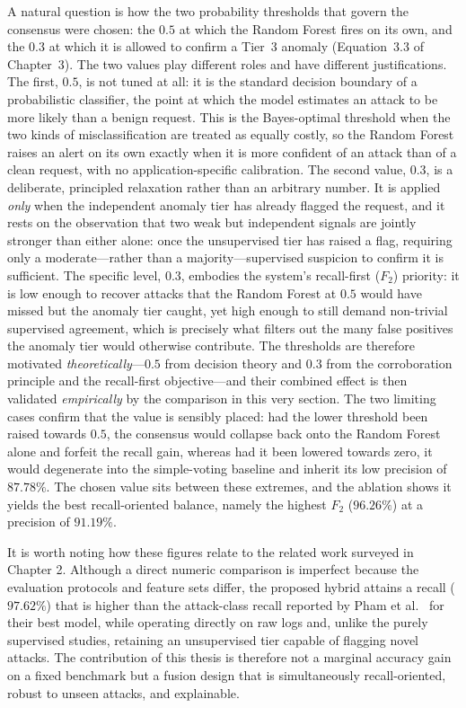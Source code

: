 \documentclass[../main.tex]{subfiles}
\begin{document}
A natural question is how the two probability thresholds that govern the
consensus were chosen: the $0.5$ at which the Random Forest fires on its own,
and the $0.3$ at which it is allowed to confirm a Tier~3 anomaly
(Equation~3.3 of Chapter~3). The two values play different roles and have
different justifications. The first, $0.5$, is not tuned at all: it is the
standard decision boundary of a probabilistic classifier, the point at which
the model estimates an attack to be more likely than a benign request. This is
the Bayes-optimal threshold when the two kinds of misclassification are treated
as equally costly, so the Random Forest raises an alert on its own exactly when
it is more confident of an attack than of a clean request, with no
application-specific calibration. The second value, $0.3$, is a deliberate,
principled relaxation rather than an arbitrary number. It is applied
\emph{only} when the independent anomaly tier has already flagged the request,
and it rests on the observation that two weak but independent signals are
jointly stronger than either alone: once the unsupervised tier has raised a
flag, requiring only a moderate---rather than a majority---supervised suspicion
to confirm it is sufficient. The specific level, $0.3$, embodies the system's
recall-first ($F_2$) priority: it is low enough to recover attacks that the
Random Forest at $0.5$ would have missed but the anomaly tier caught, yet high
enough to still demand non-trivial supervised agreement, which is precisely
what filters out the many false positives the anomaly tier would otherwise
contribute. The thresholds are therefore motivated \emph{theoretically}---$0.5$
from decision theory and $0.3$ from the corroboration principle and the
recall-first objective---and their combined effect is then validated
\emph{empirically} by the comparison in this very section. The two limiting
cases confirm that the value is sensibly placed: had the lower threshold been
raised towards $0.5$, the consensus would collapse back onto the Random Forest
alone and forfeit the recall gain, whereas had it been lowered towards zero, it
would degenerate into the simple-voting baseline and inherit its low precision
of $87.78\%$. The chosen value sits between these extremes, and the ablation
shows it yields the best recall-oriented balance, namely the highest $F_2$
($96.26\%$) at a precision of $91.19\%$.

It is worth noting how these figures relate to the related work surveyed in
Chapter 2. Although a direct numeric comparison is
imperfect because the evaluation protocols and feature sets differ, the
proposed hybrid attains a recall ($97.62\%$) that is higher than the
attack-class recall reported by Pham et al.~\cite{pham2016} for their best
model, while operating directly on raw logs and, unlike the purely supervised
studies, retaining an unsupervised tier capable of flagging novel attacks.
The contribution of this thesis is therefore not a marginal accuracy gain on
a fixed benchmark but a fusion design that is simultaneously
recall-oriented, robust to unseen attacks, and explainable.
\end{document}

